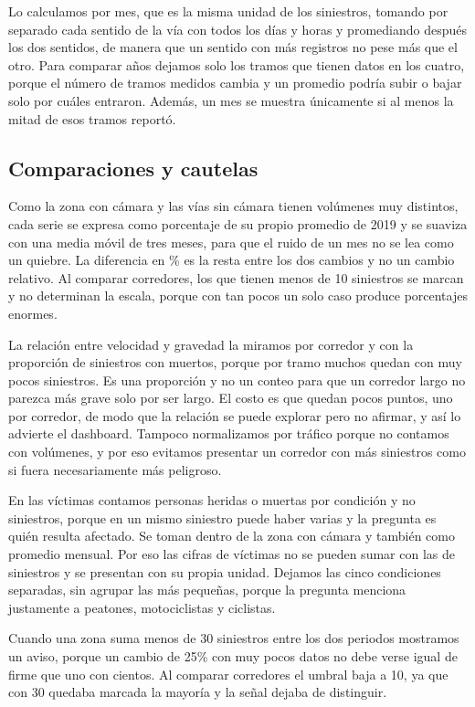 \documentclass[10pt,a4paper]{article}
\begin{document}
Lo calculamos por mes, que es la misma unidad de los siniestros, tomando por separado cada sentido de la vía con todos los días y horas y promediando después los dos sentidos, de manera que un sentido con más registros no pese más que el otro. Para comparar años dejamos solo los tramos que tienen datos en los cuatro, porque el número de tramos medidos cambia y un promedio podría subir o bajar solo por cuáles entraron. Además, un mes se muestra únicamente si al menos la mitad de esos tramos reportó.

\subsection{Comparaciones y cautelas}

Como la zona con cámara y las vías sin cámara tienen volúmenes muy distintos, cada serie se expresa como porcentaje de su propio promedio de 2019 y se suaviza con una media móvil de tres meses, para que el ruido de un mes no se lea como un quiebre. La diferencia en \% es la resta entre los dos cambios y no un cambio relativo. Al comparar corredores, los que tienen menos de 10 siniestros se marcan y no determinan la escala, porque con tan pocos un solo caso produce porcentajes enormes.

La relación entre velocidad y gravedad la miramos por corredor y con la proporción de siniestros con muertos, porque por tramo muchos quedan con muy pocos siniestros. Es una proporción y no un conteo para que un corredor largo no parezca más grave solo por ser largo. El costo es que quedan pocos puntos, uno por corredor, de modo que la relación se puede explorar pero no afirmar, y así lo advierte el dashboard. Tampoco normalizamos por tráfico porque no contamos con volúmenes, y por eso evitamos presentar un corredor con más siniestros como si fuera necesariamente más peligroso.


En las víctimas contamos personas heridas o muertas por condición y no siniestros, porque en un mismo siniestro puede haber varias y la pregunta es quién resulta afectado. Se toman dentro de la zona con cámara y también como promedio mensual. Por eso las cifras de víctimas no se pueden sumar con las de siniestros y se presentan con su propia unidad. Dejamos las cinco condiciones separadas, sin agrupar las más pequeñas, porque la pregunta menciona justamente a peatones, motociclistas y ciclistas.

Cuando una zona suma menos de 30 siniestros entre los dos periodos mostramos un aviso, porque un cambio de 25\% con muy pocos datos no debe verse igual de firme que uno con cientos. Al comparar corredores el umbral baja a 10, ya que con 30 quedaba marcada la mayoría y la señal dejaba de distinguir.
\end{document}
